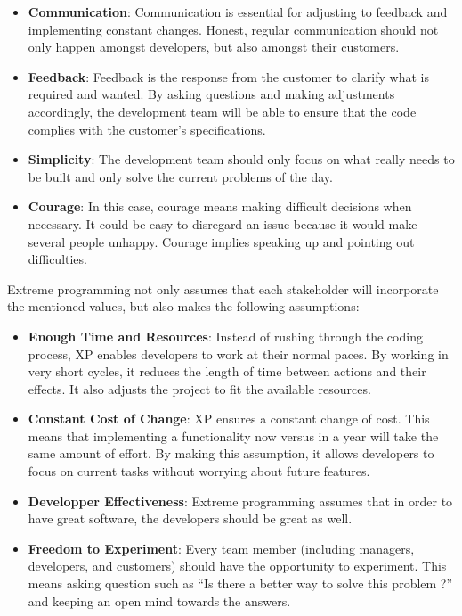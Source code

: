 \documentclass[]{article}
\begin{document}
\begin{itemize}
\itemsep1pt\parskip0pt
\item
  \textbf{Communication}: Communication is essential for adjusting to
  feedback and implementing constant changes. Honest, regular
  communication should not only happen amongst developers, but also
  amongst their customers.
\item
  \textbf{Feedback}: Feedback is the response from the customer to
  clarify what is required and wanted. By asking questions and making
  adjustments accordingly, the development team will be able to ensure
  that the code complies with the customer's specifications.
\item
  \textbf{Simplicity}: The development team should only focus on what
  really needs to be built and only solve the current problems of the
  day.
\item
  \textbf{Courage}: In this case, courage means making difficult
  decisions when necessary. It could be easy to disregard an issue
  because it would make several people unhappy. Courage implies speaking
  up and pointing out difficulties.
\end{itemize}

Extreme programming not only assumes that each stakeholder will
incorporate the mentioned values, but also makes the following
assumptions:

\begin{itemize}
\itemsep1pt\parskip0pt
\item
  \textbf{Enough Time and Resources}: Instead of rushing through the
  coding process, XP enables developers to work at their normal paces.
  By working in very short cycles, it reduces the length of time between
  actions and their effects. It also adjusts the project to fit the
  available resources.
\item
  \textbf{Constant Cost of Change}: XP ensures a constant change of
  cost. This means that implementing a functionality now versus in a
  year will take the same amount of effort. By making this assumption,
  it allows developers to focus on current tasks without worrying about
  future features.
\item
  \textbf{Developper Effectiveness}: Extreme programming assumes that in
  order to have great software, the developers should be great as well.
\item
  \textbf{Freedom to Experiment}: Every team member (including managers,
  developers, and customers) should have the opportunity to experiment.
  This means asking question such as ``Is there a better way to solve
  this problem ?'' and keeping an open mind towards the answers.
\end{itemize}
\end{document}
